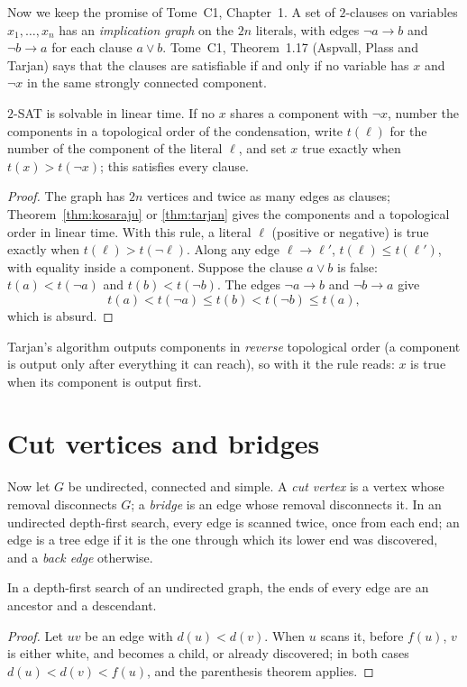 Now we keep the promise of Tome~C1, Chapter~1. A set of $2$-clauses on variables $x_1,\dots,x_n$ has an \emph{implication graph} on the $2n$ literals, with edges $\neg a\to b$ and $\neg b\to a$ for each clause $a\vee b$.
Tome~C1, Theorem~1.17 (Aspvall, Plass and Tarjan) says that the clauses are satisfiable if and only if no variable has $x$ and $\neg x$ in the same strongly connected component.

\begin{theorem}\label{thm:twosatlinear}
$2$-SAT is solvable in linear time. If no $x$ shares a component with $\neg x$, number the components in a topological order of the condensation, write $t(\ell)$ for the number of the component of the
literal $\ell$, and set $x$ true exactly when $t(x)>t(\neg x)$; this satisfies every clause.
\end{theorem}
\begin{proof}
The graph has $2n$ vertices and twice as many edges as clauses; Theorem~\ref{thm:kosaraju} or \ref{thm:tarjan} gives the components and a topological order in linear time. With this rule, a literal $\ell$ (positive or negative)
is true exactly when $t(\ell)>t(\neg\ell)$. Along any edge $\ell\to\ell'$, $t(\ell)\le t(\ell')$, with equality inside a component. Suppose the clause $a\vee b$ is false: $t(a)<t(\neg a)$ and $t(b)<t(\neg b)$. The edges $\neg a\to b$
and $\neg b\to a$ give
\[
t(a)<t(\neg a)\le t(b)<t(\neg b)\le t(a),
\]
which is absurd.
\end{proof}

Tarjan's algorithm outputs components in \emph{reverse} topological order (a component is output only after everything it can reach), so with it the rule reads: $x$ is true when its component is output first.

\section{Cut vertices and bridges}\label{sec:cutvertices}

Now let $G$ be undirected, connected and simple. A \emph{cut vertex} is a vertex whose removal disconnects $G$; a \emph{bridge} is an edge whose removal disconnects it. In an undirected depth-first
search, every edge is scanned twice, once from each end; an edge is a tree edge if it is the one through which its lower end was discovered, and a \emph{back edge} otherwise.

\begin{lemma}\label{lem:noncross}
In a depth-first search of an undirected graph, the ends of every edge are an ancestor and a descendant.
\end{lemma}
\begin{proof}
Let $uv$ be an edge with $d(u)<d(v)$. When $u$ scans it, before $f(u)$, $v$ is either white, and becomes a child, or already discovered; in both cases $d(u)<d(v)<f(u)$, and the parenthesis theorem applies.
\end{proof}

